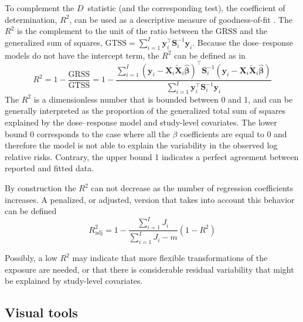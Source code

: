 \documentclass[11pt,a4paper,twoside,openany]{book}\usepackage{knitr}
\begin{document}
{To complement the $D$~statistic (and the corresponding test), the coefficient of determination, $R^2$, can be used as a descriptive measure of goodness-of-fit \citep{hagquist1998goodness, kvaalseth1985cautionary}. The $R^2$ is the complement to the unit of the ratio between the $\textrm{GRSS}$ and the generalized sum of squares, $\textrm{GTSS} = \sum_{i=1}^I\mathbf{y}_i^\top \mathbf{S}_i^{-1} \mathbf{y}_i$. Because the dose--response models do not have the intercept term, the $R^2$ can be defined as in \citep{buse1973goodness, theil1958economic}
\begin{equation}
R^2 = 1 - \frac{\textrm{GRSS}}{\textrm{GTSS}} = 1 - \frac{\sum_{i=1}^I \left(\mathbf{y}_i - \mathbf{X}_i \widetilde{\mathbf{X}}_i \boldsymbol{\hat \beta} \right)^\top \mathbf{S}_i^{-1} \left(\mathbf{y}_i - \mathbf{X}_i \widetilde{\mathbf{X}}_i \boldsymbol{\hat \beta} \right)}{\sum_{i=1}^I \mathbf{y}_i^\top \mathbf{S}_i^{-1} \mathbf{y}_i}
\label{eq:R2}
\end{equation}
\noindent The $R^2$ is a dimensionless number that is bounded between 0 and 1, and can be generally interpreted as the proportion of the generalized total sum of squares explained by the dose--response model and study-level covariates. The lower bound 0 corresponds to the case where all the $\beta$ coefficients are equal to 0 and therefore the model is not able to explain the variability in the observed log relative risks. Contrary, the upper bound 1 indicates a perfect agreement between reported and fitted data. 

By construction the $R^2$ can not decrease as the number of regression coefficients increases. A penalized, or adjusted, version that takes into account this behavior can be defined
\begin{equation}
R^2_{\textrm{adj}} = 1 - \frac{\sum_{i=1}^I J_i}{\sum_{i=1}^I J_i-m} \left(1 - R^2 \right)
\label{eq:R2adj}
\end{equation}

Possibly, a low $R^2$ may indicate that more flexible transformations of the exposure are needed, or that there is considerable residual variability that might be explained by study-level covariates.

\subsection{Visual tools}



}
\end{document}
